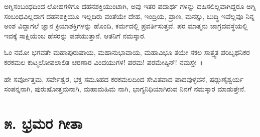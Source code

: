 ಅಗ್ನಿಸಂಬಂಧದಿಂದ ಲೋಹಗಳಿಗೂ ದಹನಶಕ್ತಿಯುಂಟಾಗಿ, ಅವು ಇತರ ಪದಾರ್ಥ ಗಳನ್ನು ದಹಿಸಲಿಲ್ಲವಾಗಿದ್ದರೂ ಅಗ್ನಿ ಸಂಬಂಧವಿಲ್ಲದಾಗ ದಹನಶಕ್ತಿಯೂ ಇಲ್ಲದಿರು ವಂತೆಯೇ ದೇಹ, ಇಂದ್ರಿಯ, ಪ್ರಾಣ, ಮನಸ್ಸು, ಬುದ್ಧಿ ಇವೆಲ್ಲವೂ ನಿನ್ನ ಅಂಶ ವಿದ್ದಾಗಲೆ ಜ್ಞಾನ ಕ್ರಿಯಾಶಕ್ತಿಗಳನ್ನು ಹೊಂದಿ, ಕರ್ಮದಲ್ಲಿ ಪ್ರವರ್ತಿಸುತ್ತವೆ. ಪರ ಮಾತ್ಮನು ಜಾಗ್ರದವಸ್ಥೆಯಲ್ಲಿ ಇವಕ್ಕೆ ಸಾಕ್ಷಿಯೆಂಬ ಹೆಸರನ್ನು ಪಡೆಯುತ್ತಾನೆ. ಆತನಿಗೆ ನಮಸ್ಕಾರ.

ಓಂ ನಮೋ ಭಗವತೇ ಮಹಾಪುರುಷಾಯ, ಮಹಾನುಭಾವಾಯ, ಮಹಾವಿಭೂ ತಯೇ ಸಕಲ ಸಾತ್ತ್ವತ ಪರಿಬೃಥನಿಕರ ಕರಕಮಲ ಕುಟ್ಮಲೋಪಲಾಲಿತ ಚರಣಾರ ವಿಂದಯುಗಳ! ಪರಮ! ಪರಮೇಷ್ಠಿನ್​! ನಮಸ್ತೇ ॥

ಹೇ ಸರ್ವೋತ್ತಮ, ಸರ್ವೇಶ್ವರ, ಭಕ್ತ ಸಮೂಹದ ಕರಕಮಲದಿಂದ ಸೇವಿತವಾದ ಪಾದವುಳ್ಳವನೆ, ಷಡ್ಗುಣೈಶ್ವರ್ಯ ಸಂಪನ್ನನಾಗಿ, ಪುರುಷೋತ್ತಮನಾಗಿ, ಮಹಾಮಹಿಮ ನಾಗಿ, ಭಾಗ್ಯನಿಧಿಯಾಗಿರುವ ನಿನಗೆ ನಮಸ್ಕಾರ ಮಾಡುತ್ತೇನೆ.


\section{೫. ಭ್ರಮರ ಗೀತಾ}

